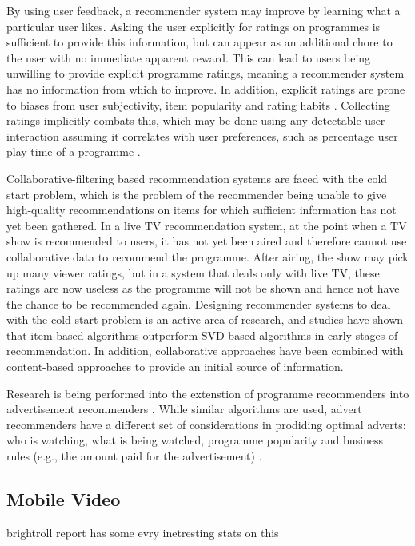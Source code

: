 	By using user feedback, a recommender system may improve by learning what a particular user likes. Asking the user explicitly for ratings on programmes is sufficient to provide this information, but can appear as an additional chore to the user with no immediate apparent reward. This can lead to users being unwilling to provide explicit programme ratings, meaning a recommender system has no information from which to improve. In addition, explicit ratings are prone to biases from user subjectivity, item popularity and rating habits \citep[p.~304]{recommender-systems-handbook}. Collecting ratings implicitly combats this, which may be done using any detectable user interaction assuming it correlates with user preferences, such as percentage user play time of a programme \citep[p.~305]{recommender-systems-handbook}.

	Collaborative-filtering based recommendation systems are faced with the cold start problem, which is the problem of the recommender being unable to give high-quality recommendations on items for which sufficient information has not yet been gathered. In a live TV recommendation system, at the point when a TV show is recommended to users, it has not yet been aired and therefore cannot use collaborative data to recommend the programme. After airing, the show may pick up many viewer ratings, but in a system that deals only with live TV, these ratings are now useless as the programme will not be shown and hence not have the chance to be recommended again. Designing recommender systems to deal with the cold start problem is an active area of research, and studies have shown that item-based algorithms outperform SVD-based algorithms in early stages of recommendation\cite{cold-start-problem}. In addition, collaborative approaches have been combined with content-based approaches to provide an initial source of information\cite{generative_models}.

	Research is being performed into the extenstion of programme recommenders into advertisement recommenders \cite{contextual_advertising}. While similar algorithms are used, advert recommenders have a different set of considerations in prodiding optimal adverts: who is watching, what is being watched, programme popularity and business rules (e.g., the amount paid for the advertisement) \cite{contextual_advertising}.

	\subsection{Mobile Video}

	brightroll report has some evry inetresting stats on this

